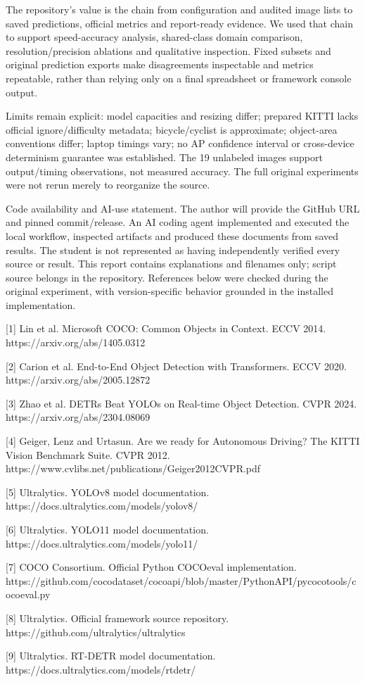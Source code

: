 \documentclass[10pt]{article}
\begin{document}
The repository's value is the chain from configuration and audited image lists to saved predictions, official metrics and report-ready evidence. We used that chain to support speed-accuracy analysis, shared-class domain comparison, resolution/precision ablations and qualitative inspection. Fixed subsets and original prediction exports make disagreements inspectable and metrics repeatable, rather than relying only on a final spreadsheet or framework console output.


Limits remain explicit: model capacities and resizing differ; prepared KITTI lacks official ignore/difficulty metadata; bicycle/cyclist is approximate; object-area conventions differ; laptop timings vary; no AP confidence interval or cross-device determinism guarantee was established. The 19 unlabeled images support output/timing observations, not measured accuracy. The full original experiments were not rerun merely to reorganize the source.


Code availability and AI-use statement. The author will provide the GitHub URL and pinned commit/release. An AI coding agent implemented and executed the local workflow, inspected artifacts and produced these documents from saved results. The student is not represented as having independently verified every source or result. This report contains explanations and filenames only; script source belongs in the repository. References below were checked during the original experiment, with version-specific behavior grounded in the installed implementation.


[1] Lin et al. Microsoft COCO: Common Objects in Context. ECCV 2014. https://arxiv.org/abs/1405.0312


[2] Carion et al. End-to-End Object Detection with Transformers. ECCV 2020. https://arxiv.org/abs/2005.12872


[3] Zhao et al. DETRs Beat YOLOs on Real-time Object Detection. CVPR 2024. https://arxiv.org/abs/2304.08069


[4] Geiger, Lenz and Urtasun. Are we ready for Autonomous Driving? The KITTI Vision Benchmark Suite. CVPR 2012. https://www.cvlibs.net/publications/Geiger2012CVPR.pdf


[5] Ultralytics. YOLOv8 model documentation. https://docs.ultralytics.com/models/yolov8/


[6] Ultralytics. YOLO11 model documentation. https://docs.ultralytics.com/models/yolo11/


[7] COCO Consortium. Official Python COCOeval implementation. https://github.com/cocodataset/cocoapi/blob/master/PythonAPI/pycocotools/cocoeval.py


[8] Ultralytics. Official framework source repository. https://github.com/ultralytics/ultralytics


[9] Ultralytics. RT-DETR model documentation. https://docs.ultralytics.com/models/rtdetr/
\end{document}

